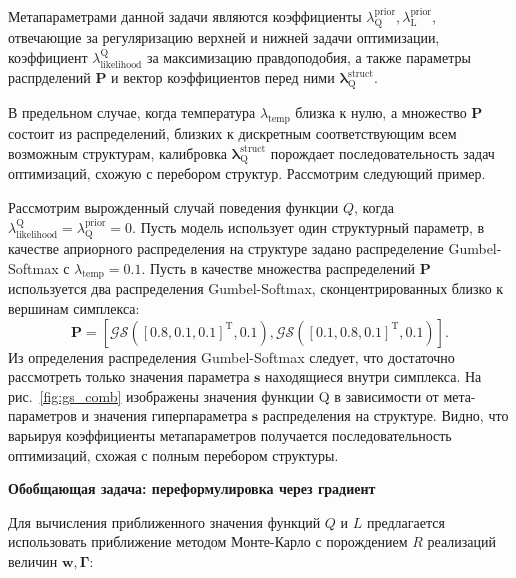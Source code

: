 Метапараметрами данной задачи являются коэффициенты $\lambda^\text{prior}_\text{Q}, \lambda^\text{prior}_\text{L}$, отвечающие за регуляризацию верхней и нижней задачи оптимизации, коэффициент $\lambda_\text{likelihood}^\text{Q}$ за максимизацию правдоподобия, а также параметры распрделений $\mathbf{P}$ и вектор коэффициентов перед ними $\boldsymbol{\lambda}^\text{struct}_\text{Q}$. 

В предельном случае, когда температура $\lambda_\text{temp}$ близка к нулю, а множество $\mathbf{P}$ состоит из распределений, близких к дискретным соответствующим всем возможным структурам, калибровка $\boldsymbol{\lambda}^\text{struct}_\text{Q}$ порождает последовательность задач оптимизаций, схожую с перебором структур. Рассмотрим следующий пример. 

\begin{example} 
Рассмотрим вырожденный случай поведения функции $Q$, когда $\lambda_\text{likelihood}^\text{Q} = \lambda^\text{prior}_\text{Q} = 0$. Пусть модель использует один структурный параметр, в качестве априорного распределения на структуре задано распределение Gumbel-Softmax с $\lambda_\text{temp}=0.1$. Пусть в качестве множества распределений $\mathbf{P}$ используется два распределения Gumbel-Softmax, сконцентрированных близко к вершинам симплекса:
\[
    \mathbf{P} = [\mathcal{GS}([0.8, 0.1, 0.1]^\text{T}, 0.1) ,\mathcal{GS}([0.1, 0.8, 0.1]^\text{T}, 0.1)].
\]
Из определения распределения Gumbel-Softmax следует, что достаточно рассмотреть только значения параметра $\mathbf{s}$ находящиеся внутри симплекса.
На рис.~\ref{fig:gs_comb} изображены значения функции Q в зависимости от мета-параметров и значения гиперпараметра $\mathbf{s}$ распределения на структуре. Видно, что варьируя  коэффициенты метапараметров получается последовательность оптимизаций, схожая с полным перебором структуры.
\end{example}

\textbf{Обобщающая задача: переформулировка через градиент}



Для вычисления приближенного значения функций $Q$ и $L$ предлагается использовать приближение методом Монте-Карло с порождением $R$ реализаций величин $\mathbf{w}, \boldsymbol{\Gamma}$:

